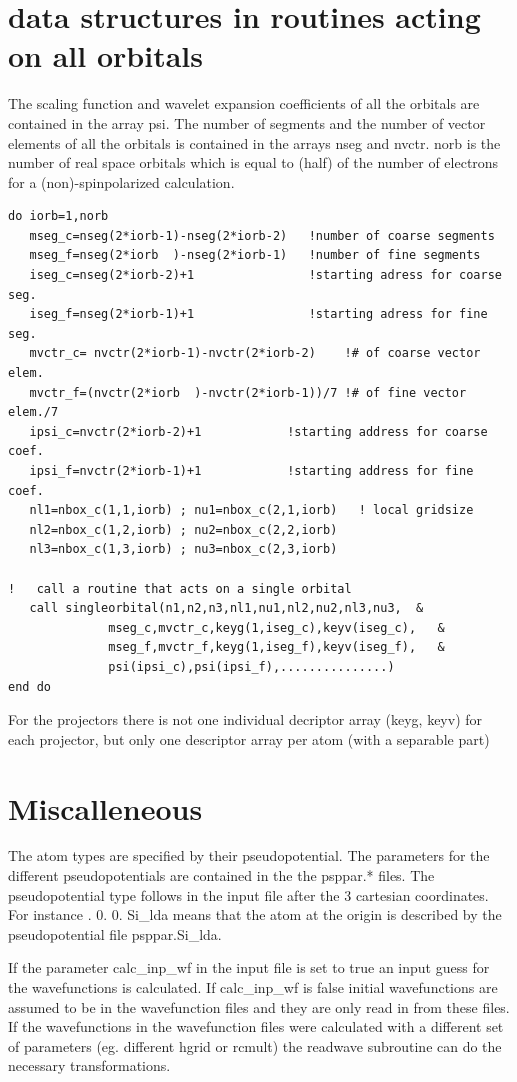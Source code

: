 \documentclass[12pt]{article}
\begin{document}
\section{data structures in routines acting on all orbitals}
The scaling function and wavelet expansion coefficients of all the orbitals are 
contained in the array {\color{red} psi}. The number of segments and the number of 
vector elements of all the orbitals is contained in the arrays {\color{red} nseg} and 
{\color{red} nvctr}. 
{\color{red} norb} is the number of real space orbitals which is equal to (half) 
of the number of electrons for a (non)-spinpolarized calculation.

\begin{verbatim}
do iorb=1,norb
   mseg_c=nseg(2*iorb-1)-nseg(2*iorb-2)   !number of coarse segments
   mseg_f=nseg(2*iorb  )-nseg(2*iorb-1)   !number of fine segments
   iseg_c=nseg(2*iorb-2)+1                !starting adress for coarse seg.
   iseg_f=nseg(2*iorb-1)+1                !starting adress for fine seg.
   mvctr_c= nvctr(2*iorb-1)-nvctr(2*iorb-2)    !# of coarse vector elem.
   mvctr_f=(nvctr(2*iorb  )-nvctr(2*iorb-1))/7 !# of fine vector elem./7
   ipsi_c=nvctr(2*iorb-2)+1            !starting address for coarse coef.
   ipsi_f=nvctr(2*iorb-1)+1            !starting address for fine coef.
   nl1=nbox_c(1,1,iorb) ; nu1=nbox_c(2,1,iorb)   ! local gridsize
   nl2=nbox_c(1,2,iorb) ; nu2=nbox_c(2,2,iorb)
   nl3=nbox_c(1,3,iorb) ; nu3=nbox_c(2,3,iorb)

!   call a routine that acts on a single orbital
   call singleorbital(n1,n2,n3,nl1,nu1,nl2,nu2,nl3,nu3,  &
              mseg_c,mvctr_c,keyg(1,iseg_c),keyv(iseg_c),   &
              mseg_f,mvctr_f,keyg(1,iseg_f),keyv(iseg_f),   &
              psi(ipsi_c),psi(ipsi_f),...............)
end do
\end{verbatim}

For the projectors there is not one individual decriptor array (keyg, keyv) for 
each projector, but only one descriptor array per atom (with a separable part)


\section{Miscalleneous}
The atom types are specified by their pseudopotential. 
The parameters for the different pseudopotentials are contained in the 
the psppar.* files.
The pseudopotential type follows in the input file after the 3 cartesian coordinates. 
For instance .  0. 0.  Si\_lda  \newline 
means that the atom at the origin is described by the pseudopotential 
file psppar.Si\_lda.

If the parameter { \color{red} calc\_inp\_wf } in the input file is set to true an 
input guess for the wavefunctions is calculated.
If  calc\_inp\_wf is false initial wavefunctions are assumed to be in the 
wavefunction files and they are only read in from these files. If the wavefunctions 
in the wavefunction files were calculated with a different set of parameters (eg. 
different hgrid or rcmult) the readwave subroutine can do the necessary 
transformations. 
\end{document}
